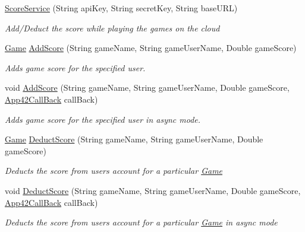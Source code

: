 \begin{DoxyCompactItemize}
\item 
\hyperlink{classcom_1_1shephertz_1_1app42_1_1paas_1_1sdk_1_1csharp_1_1game_1_1_score_service_a18f8f7c0220a685267b549c918b8be82}{Score\+Service} (String api\+Key, String secret\+Key, String base\+U\+R\+L)
\begin{DoxyCompactList}\small\item\em Add/\+Deduct the score while playing the games on the cloud \end{DoxyCompactList}\item 
\hyperlink{classcom_1_1shephertz_1_1app42_1_1paas_1_1sdk_1_1csharp_1_1game_1_1_game}{Game} \hyperlink{classcom_1_1shephertz_1_1app42_1_1paas_1_1sdk_1_1csharp_1_1game_1_1_score_service_a700ac1ef078c9f3bc4f9c3d183b97ccd}{Add\+Score} (String game\+Name, String game\+User\+Name, Double game\+Score)
\begin{DoxyCompactList}\small\item\em Adds game score for the specified user. \end{DoxyCompactList}\item 
void \hyperlink{classcom_1_1shephertz_1_1app42_1_1paas_1_1sdk_1_1csharp_1_1game_1_1_score_service_ad160c52455dc8c17161a73b0b64ddbde}{Add\+Score} (String game\+Name, String game\+User\+Name, Double game\+Score, \hyperlink{interfacecom_1_1shephertz_1_1app42_1_1paas_1_1sdk_1_1csharp_1_1_app42_call_back}{App42\+Call\+Back} call\+Back)
\begin{DoxyCompactList}\small\item\em Adds game score for the specified user in async mode. \end{DoxyCompactList}\item 
\hyperlink{classcom_1_1shephertz_1_1app42_1_1paas_1_1sdk_1_1csharp_1_1game_1_1_game}{Game} \hyperlink{classcom_1_1shephertz_1_1app42_1_1paas_1_1sdk_1_1csharp_1_1game_1_1_score_service_a31a4ae34a0de4d391b20413b857d479a}{Deduct\+Score} (String game\+Name, String game\+User\+Name, Double game\+Score)
\begin{DoxyCompactList}\small\item\em Deducts the score from users account for a particular \hyperlink{classcom_1_1shephertz_1_1app42_1_1paas_1_1sdk_1_1csharp_1_1game_1_1_game}{Game} \end{DoxyCompactList}\item 
void \hyperlink{classcom_1_1shephertz_1_1app42_1_1paas_1_1sdk_1_1csharp_1_1game_1_1_score_service_ad4a01ab7520f744285411a7319c40479}{Deduct\+Score} (String game\+Name, String game\+User\+Name, Double game\+Score, \hyperlink{interfacecom_1_1shephertz_1_1app42_1_1paas_1_1sdk_1_1csharp_1_1_app42_call_back}{App42\+Call\+Back} call\+Back)
\begin{DoxyCompactList}\small\item\em Deducts the score from users account for a particular \hyperlink{classcom_1_1shephertz_1_1app42_1_1paas_1_1sdk_1_1csharp_1_1game_1_1_game}{Game} in async mode \end{DoxyCompactList}\end{DoxyCompactItemize}
